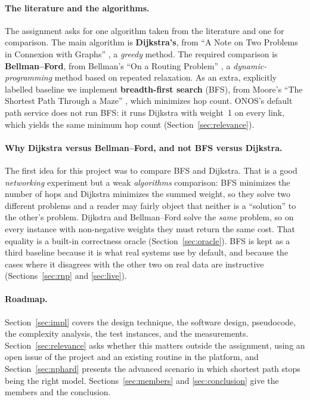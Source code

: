 \documentclass[11pt,a4paper]{article}
\begin{document}
\paragraph{The literature and the algorithms.}
The assignment asks for one algorithm taken from the literature and one for comparison.
The main algorithm is \textbf{Dijkstra's}, from ``A Note on Two Problems in Connexion with
Graphs'' \cite{dijkstra1959}, a \emph{greedy} method. The required comparison is
\textbf{Bellman--Ford}, from Bellman's ``On a Routing Problem'' \cite{bellman1958}, a
\emph{dynamic-programming} method based on repeated relaxation. As an extra, explicitly
labelled baseline we implement \textbf{breadth-first search} (BFS), from Moore's ``The
Shortest Path Through a Maze'' \cite{moore1959}, which minimizes hop count. ONOS's default
path service does not run BFS: it runs Dijkstra with weight~1 on every link, which yields the
same minimum hop count (Section~\ref{sec:relevance}).

\paragraph{Why Dijkstra versus Bellman--Ford, and not BFS versus Dijkstra.}
The first idea for this project was to compare BFS and Dijkstra. That is a good
\emph{networking} experiment but a weak \emph{algorithms} comparison: BFS minimizes the
number of hops and Dijkstra minimizes the summed weight, so they solve two different
problems and a reader may fairly object that neither is a ``solution'' to the other's
problem. Dijkstra and Bellman--Ford solve the \emph{same} problem, so on every instance
with non-negative weights they must return the same cost. That equality is a built-in
correctness oracle (Section~\ref{sec:oracle}). BFS is kept as a third baseline because it
is what real systems use by default, and because the cases where it disagrees with the
other two on real data are instructive (Sections~\ref{sec:rnp} and \ref{sec:live}).

\paragraph{Roadmap.}
Section~\ref{sec:impl} covers the design technique, the software design, pseudocode, the
complexity analysis, the test instances, and the measurements. Section~\ref{sec:relevance}
asks whether this matters outside the assignment, using an open issue of the project and
an existing routine in the platform, and Section~\ref{sec:nphard} presents the advanced
scenario in which shortest path stops being the right model. Sections~\ref{sec:members} and
\ref{sec:conclusion} give the members and the conclusion.
\end{document}
